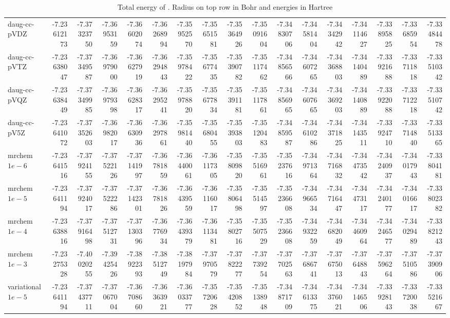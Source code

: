 \documentclass[../master_thesis.tex]{subfiles}
\begin{document}
\begin{sidewaystable}
{{\begin{tabular}{l|r|r|r|r|r|r|r|r|r|r|r|r|r|r|r|r}
daug-cc-pVDZ & -7.23612173 & -7.37323750 & -7.36953159 & -7.36602074 & -7.36268994 & -7.35952570 & -7.35651581 & -7.35364926 & -7.35091604 & -7.34830706 & -7.34581404 & -7.34342942 & -7.34114627 & -7.33895825 & -7.33685954 & -7.33484478 \\
daug-cc-pVTZ & -7.23638047 & -7.37349587 & -7.36979000 & -7.36627919 & -7.36294843 & -7.35978422 & -7.35677435 & -7.35390782 & -7.35117462 & -7.34856566 & -7.34607265 & -7.34368803 & -7.34140489 & -7.33921688 & -7.33711818 & -7.33510342 \\
daug-cc-pVQZ & -7.23638449 & -7.37349985 & -7.36979398 & -7.36628317 & -7.36295241 & -7.35978820 & -7.35677834 & -7.35391181 & -7.35117861 & -7.34856965 & -7.34607665 & -7.34369203 & -7.34140889 & -7.33922088 & -7.33712218 & -7.33510742 \\
daug-cc-pV5Z & -7.23641072 & -7.37352603 & -7.36982017 & -7.36630936 & -7.36297861 & -7.35981440 & -7.35680455 & -7.35393803 & -7.35120483 & -7.34859587 & -7.34610286 & -7.34371825 & -7.34143511 & -7.33924710 & -7.33714840 & -7.33513365 \\ \hline
mrchem $1e-6$& -7.23641516 & -7.37924155 & -7.37522126 & -7.37141997 & -7.36781859 & -7.36440061 & -7.36117305 & -7.35809820 & -7.35516961 & -7.35237616 & -7.34971364 & -7.34716832 & -7.34473542 & -7.34240937 & -7.34017943 & -7.33804181 \\
mrchem $1e-5$& -7.23641194 & -7.37924017 & -7.37522286 & -7.37142301 & -7.36781826 & -7.36439559 & -7.36116017 & -7.35806498 & -7.35514597 & -7.35236608 & -7.34966534 & -7.34716447 & -7.34473117 & -7.34240177 & -7.34016617 & -7.33802382 \\
mrchem $1e-4$& -7.23638816 & -7.37916498 & -7.37512731 & -7.37130396 & -7.36776934 & -7.36439379 & -7.36113481 & -7.35802716 & -7.35507529 & -7.35236608 & -7.34932259 & -7.34682049 & -7.34460964 & -7.34246577 & -7.34029489 & -7.33821243 \\
mrchem $1e-3$ & -7.23275328 & -7.40020255 & -7.39425426 & -7.38922393 & -7.38512749 & -7.38197984 & -7.37970579 & -7.37822277 & -7.37739254 & -7.37702563 & -7.37686741 & -7.37675013 & -7.37648843 & -7.37596264 & -7.37510586 & -7.37390906 \\
variational $1e-5$ & -7.23641194 & -7.37437711 & -7.37067004 & -7.36708660 & -7.36363921 & -7.36033777 & -7.35720628 & -7.35420852 & -7.35138948 & -7.34871709 & -7.34613375 & -7.34376021 & -7.34146506 & -7.33928143 & -7.33720038 & -7.33521667 \\
\end{tabular}}}{\caption{Total energy of . Radius on top row in Bohr and energies in Hartree}
\label{tab:rawLipdata}}


\end{sidewaystable}
\end{document}
